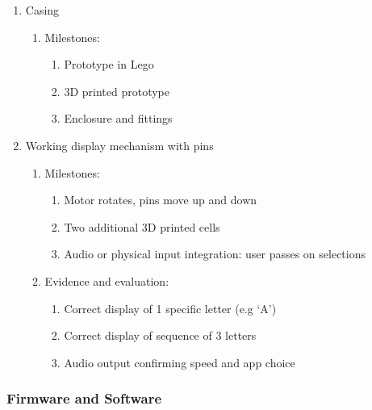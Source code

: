 \documentclass{article}
\begin{document}
\begin{enumerate}
  \item Casing
  \begin{enumerate}
    \item Milestones:
    \begin{enumerate}
      \item Prototype in Lego
      \item 3D printed prototype
      \item Enclosure and fittings
    \end{enumerate}
  \end{enumerate}
  \item Working display mechanism with pins
  \begin{enumerate}
    \item Milestones:
    \begin{enumerate}
      \item Motor rotates, pins move up and down
      \item Two additional 3D printed cells
      \item Audio or physical input integration: user passes on selections
    \end{enumerate}
    \item Evidence and evaluation:
    \begin{enumerate}
      \item Correct display of 1 specific letter (e.g `A')
      \item Correct display of sequence of 3 letters
      \item Audio output confirming speed and app choice
    \end{enumerate}
  \end{enumerate}
\end{enumerate}

\subsubsection{Firmware and Software}
\end{document}
